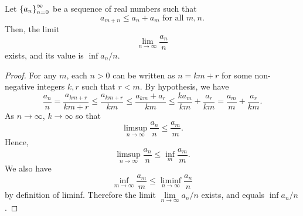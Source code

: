 \documentclass[12pt,twoside,draft]{book}
\begin{document}
\begin{lemma}
  \citep[Theorem 4.9]{walters}
  Let $\left \{ a_n \right \}^{\infty}_{n = 0}$ be a sequence of real numbers such that 
  \begin{equation*}
    a_{m+n} \leq a_n + a_m \mbox{ for all } m,n.
  \end{equation*}
  Then, the limit
  \begin{equation*}
    \lim\limits_{n \to \infty} \frac{a_n}{n} 
  \end{equation*}
  exists, and its value is $\inf a_n / n$.
  \begin{proof}
    For any $m$, each $n > 0$ can be written as $n = km + r$ for some non-negative integers $k,r$ such that $r < m$.
    By hypothesis, we have 
    \begin{equation*}
      \frac{a_n}{n}
      = \frac{a_{km + r}}{km + r}
      \leq \frac{a_{km + r}}{km}
      \leq \frac{a_{km} + a_r}{km}
      \leq \frac{k a_{m}}{km} + \frac{a_r}{km}
      = \frac{a_{m}}{m} + \frac{a_r}{km}.
    \end{equation*}
    As $n \to \infty$, $k \to \infty$ so that
    \begin{equation*}
      \limsup\limits_{n \to \infty} \frac{a_n}{n} \leq \frac{a_m}{m}.
    \end{equation*}
    Hence,
    \begin{equation*}
      \limsup\limits_{n \to \infty} \frac{a_n}{n} \leq \inf\limits_m \frac{a_m}{m}.
    \end{equation*}
    We also have
    \begin{equation*}
      \inf\limits_{m \to \infty} \frac{a_m}{m} \leq \liminf\limits_{n \to \infty} \frac{a_n}{n}
    \end{equation*}
    by definition of liminf.
    Therefore the limit $\lim\limits_{n \to \infty} a_n/n$ exists, and equals $\inf a_n/n$.
  \end{proof}
\end{lemma}
\end{document}
